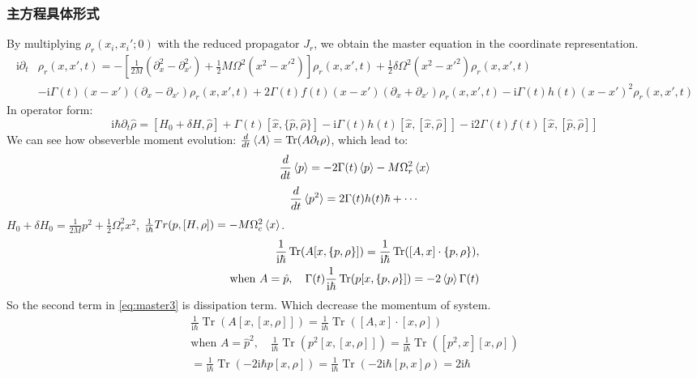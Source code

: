 \documentclass{article}
\begin{document}
\subsubsection{主方程具体形式}
By multiplying $\rho_r(x_i,x_i';0)$ with the reduced propagator $J_r$, we obtain the master equation in the coordinate representation.
    \begin{equation}
        \begin{split}
             \mathrm{i}\partial_t&\rho_r(x,x',t)=-[\frac{1}{2M}(\partial_x^2-\partial_{x'}^2)+\frac{1}{2}M\Omega^2(x^2-x'^2)]\rho_r(x,x',t)+\frac{1}{2}\delta\Omega^2(x^2-x'^2)\rho_r(x,x',t)\\&
             -\mathrm{i}\Gamma(t)(x-x')(\partial_x-\partial_{x'})\rho_r(x,x',t)
        +2\Gamma(t)f(t)(x-x')(\partial_x+\partial_{x'})\rho_r(x,x',t)-\mathrm{i}\Gamma(t)h(t)(x-x')^2\rho_r(x,x',t)
        \end{split}
    \end{equation}
In operator form:
    \begin{equation}
        \mathrm{i}\hbar\partial_t\hat{\rho}=[H_0+\delta H,\hat{\rho}]+\Gamma(t)[\hat{x},\{\hat{p},\hat{\rho}\}]-\mathrm{i}\Gamma(t)h(t)[\hat{x},[\hat{x},\hat{\rho}]]-\mathrm{i}2\Gamma(t)f(t)[\hat{x},[\hat{p},\hat{\rho}]]\label{eq:master3}
    \end{equation}
We can see how obseverble moment evolution: $\frac{d }{d t}\braket{A}=\operatorname{Tr}(A\partial_t\rho)$, which lead to:
$$\frac{d}{dt}\braket{p}=-2\Gamma(t)\braket{p}-M \Omega_r^2\braket{x}$$
$$\frac{d}{dt}\braket{p^2}=2\Gamma(t)h(t)\hbar+\cdots$$
$H_0+\delta H_0=\frac{1}{2M}p^2+\frac{1}{2}\Omega_r^2x^2$, $\frac{1}{\mathrm{i}\hbar}Tr(p,[H,\rho])=-M\Omega_c^2\braket{x}$.
    \begin{align*}
        \frac{1}{\mathrm{i}\hbar}\operatorname{Tr}(A[x,\{p,\rho\}])= \frac{1}{\mathrm{i}\hbar}\operatorname{Tr}([A,x]\cdot\{p,\rho\}),\\
          \text{when }A=\hat{p},\quad\Gamma(t)\frac{1}{\mathrm{i}\hbar}\operatorname{Tr}(p[x,\{p,\rho\}])=-2\braket{p}\Gamma(t)
    \end{align*}
    So the second term in \eqref{eq:master3} is dissipation term. Which decrease the momentum of system.
    \begin{align*}
        \frac{1}{\mathrm{i}\hbar}\operatorname{Tr}(A[x,[x,\rho]])= \frac{1}{\mathrm{i}\hbar}\operatorname{Tr}([A,x]\cdot[x,\rho])\\
        \text{when }A=\hat{p}^2,\quad \frac{1}{\mathrm{i}\hbar}\operatorname{Tr}(p^2[x,[x,\rho]])=\frac{1}{\mathrm{i}\hbar}\operatorname{Tr}([p^2,x][x,\rho])\\
        =\frac{1}{\mathrm{i}\hbar}\operatorname{Tr}(-2 \mathrm{i}\hbar p[x,\rho])=\frac{1}{\mathrm{i}\hbar}\operatorname{Tr}(-2 \mathrm{i}\hbar [p,x]\rho)=2\mathrm{i}\hbar
    \end{align*}
\end{document}
